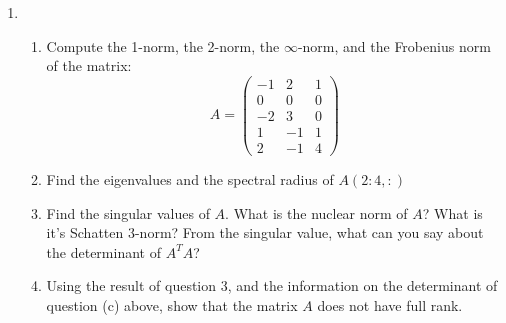 \documentclass[11pt]{article}
\begin{document}
\begin{enumerate}
	\item \begin{enumerate}[label=(\alph*)]
		      \item Compute the 1-norm, the 2-norm, the \(\infty\)-norm, and the Frobenius norm of the matrix:
		            \[A = \begin{pmatrix} -1 & 2 & 1 \\ 0 & 0 & 0 \\ -2 & 3 & 0 \\ 1 & -1 & 1 \\ 2 & -1 & 4 \end{pmatrix}\]
		      \item Find the eigenvalues and the spectral radius of \(A(2:4,:)\)
		      \item Find the singular values of \(A\).  What is the nuclear norm of \(A\)?  What is it's Schatten 3-norm?  From the singular value, what can you say about the determinant of \(A^TA\)?
		      \item Using the result of question 3, and the information on the determinant of question (c) above, show that the matrix \(A\) does not have full rank.
	      \end{enumerate}
\end{enumerate}
\end{document}
